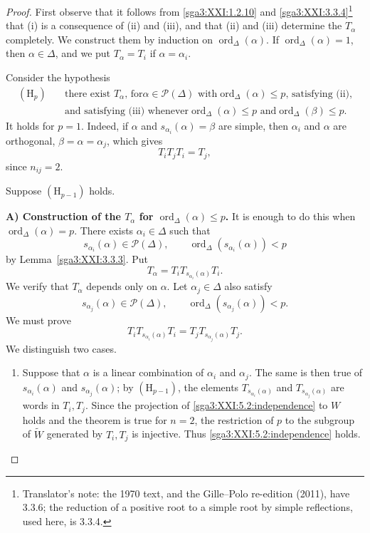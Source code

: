 \begin{proof}
First observe that it follows from
\ref{sga3:XXI:1.2.10} and \ref{sga3:XXI:3.3.4}\footnote{Translator's note: the 1970
text, and the Gille--Polo re-edition (2011), have 3.3.6; the reduction of a positive root
to a simple root by simple reflections, used here, is 3.3.4.} that (i) is a
consequence of (ii) and (iii), and that (ii) and (iii) determine the
\(T_\alpha\) completely. We construct them by induction on
\(\operatorname{ord}_\Delta(\alpha)\). If
\(\operatorname{ord}_\Delta(\alpha)=1\), then \(\alpha\in\Delta\),
and we put \(T_\alpha=T_i\) if \(\alpha=\alpha_i\).

Consider the hypothesis
\[
\begin{split}
(\mathrm{H}_p)\quad&
\text{there exist \(T_\alpha\), for
\(\alpha\in\mathscr{P}(\Delta)\) with
\(\operatorname{ord}_\Delta(\alpha)\le p\), satisfying (ii),}\\
&\text{and satisfying (iii) whenever
\(\operatorname{ord}_\Delta(\alpha)\le p\) and
\(\operatorname{ord}_\Delta(\beta)\le p\).}
\end{split}
\]
It holds for \(p=1\). Indeed, if \(\alpha\) and
\(s_{\alpha_i}(\alpha)=\beta\) are simple, then \(\alpha_i\) and
\(\alpha\) are orthogonal, \(\beta=\alpha=\alpha_j\), which gives
\[
 T_iT_jT_i=T_j,
\]
since \(n_{ij}=2\).

Suppose \((\mathrm{H}_{p-1})\) holds.

\medskip
\noindent\textbf{A) Construction of the \(T_\alpha\) for
\(\operatorname{ord}_\Delta(\alpha)\le p\).}
It is enough to do this when
\(\operatorname{ord}_\Delta(\alpha)=p\). There exists
\(\alpha_i\in\Delta\) such that
\[
 s_{\alpha_i}(\alpha)\in\mathscr{P}(\Delta),
 \qquad
 \operatorname{ord}_\Delta(s_{\alpha_i}(\alpha))<p
\]
by Lemma~\ref{sga3:XXI:3.3.3}. Put
\begin{equation}
\tag{\(\star\)}
\label{sga3:XXI:5.2:construction}
 T_\alpha=T_iT_{s_{\alpha_i}(\alpha)}T_i.
\end{equation}
We verify that \(T_\alpha\) depends only on \(\alpha\). Let
\(\alpha_j\in\Delta\) also satisfy
\[
 s_{\alpha_j}(\alpha)\in\mathscr{P}(\Delta),
 \qquad
 \operatorname{ord}_\Delta(s_{\alpha_j}(\alpha))<p.
\]
We must prove
\begin{equation}
\tag{\(+\)}
\label{sga3:XXI:5.2:independence}
 T_iT_{s_{\alpha_i}(\alpha)}T_i
 =T_jT_{s_{\alpha_j}(\alpha)}T_j.
\end{equation}
We distinguish two cases.

\begin{enumerate}
\item[(1)] Suppose that \(\alpha\) is a linear combination of
\(\alpha_i\) and \(\alpha_j\). The same is then true of
\(s_{\alpha_i}(\alpha)\) and \(s_{\alpha_j}(\alpha)\); by
\((\mathrm{H}_{p-1})\), the elements
\(T_{s_{\alpha_i}(\alpha)}\) and
\(T_{s_{\alpha_j}(\alpha)}\) are words in \(T_i,T_j\). Since the
projection of \eqref{sga3:XXI:5.2:independence} to \(W\) holds and
the theorem is true for \(n=2\), the restriction of \(p\) to the
subgroup of \(\widetilde W\) generated by \(T_i,T_j\) is injective.
Thus \eqref{sga3:XXI:5.2:independence} holds.


\end{enumerate}
\end{proof}
